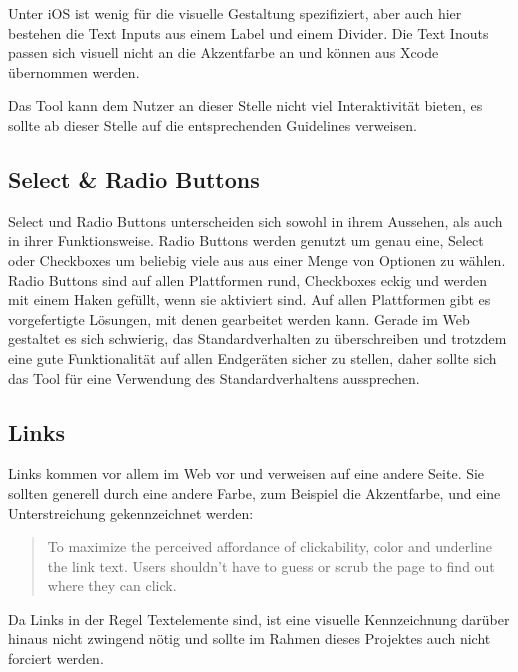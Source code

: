 Unter iOS ist wenig für die visuelle Gestaltung spezifiziert, aber auch hier bestehen die Text Inputs aus einem Label und einem Divider. Die Text Inouts passen sich visuell nicht an die Akzentfarbe an und können aus Xcode übernommen werden.

Das Tool kann dem Nutzer an dieser Stelle nicht viel Interaktivität bieten, es sollte ab dieser Stelle auf die entsprechenden Guidelines verweisen.

\subsection{Select \& Radio Buttons}
Select und Radio Buttons unterscheiden sich sowohl in ihrem Aussehen, als auch in ihrer Funktionsweise. Radio Buttons werden genutzt um genau eine, Select oder Checkboxes um beliebig viele aus  aus einer Menge von Optionen zu wählen. Radio Buttons sind auf allen Plattformen rund, Checkboxes eckig und werden mit einem Haken gefüllt, wenn sie aktiviert sind. Auf allen Plattformen gibt es vorgefertigte Lösungen, mit denen gearbeitet werden kann. Gerade im Web gestaltet es sich schwierig, das Standardverhalten zu überschreiben und trotzdem eine gute Funktionalität auf allen Endgeräten sicher zu stellen, daher sollte sich das Tool für eine Verwendung des Standardverhaltens aussprechen.

\subsection{Links}
Links kommen vor allem im Web vor und verweisen auf eine andere Seite.
Sie sollten generell durch eine andere Farbe, zum Beispiel die Akzentfarbe, und eine Unterstreichung gekennzeichnet werden:

\begin{quote}
To maximize the perceived affordance of clickability, color and underline the link text. Users shouldn't have to guess or scrub the page to find out where they can click. \cite{nielsen2004guide}
\end{quote}

Da Links in der Regel Textelemente sind, ist eine visuelle Kennzeichnung darüber hinaus nicht zwingend nötig und sollte im Rahmen dieses Projektes auch nicht forciert werden.
